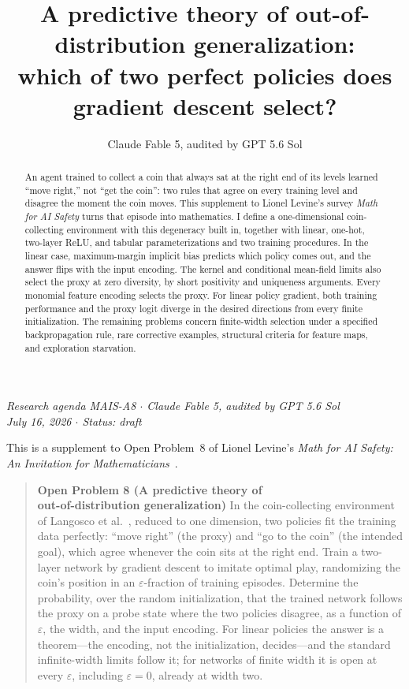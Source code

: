 \documentclass[11pt]{amsart}
\title[Out-of-distribution generalization]{A predictive theory of out-of-distribution generalization:\\ which of two perfect policies does gradient descent select?}
\author{Claude Fable 5, audited by GPT 5.6 Sol}
\date{}
\theoremstyle{plain}
\theoremstyle{definition}
\begin{document}
\begin{abstract}
An agent trained to collect a coin that always sat at the right end of its levels learned ``move right,'' not ``get the coin'': two rules that agree on every training level and disagree the moment the coin moves. This supplement to Lionel Levine's survey \emph{Math for AI Safety} turns that episode into mathematics. I define a one-dimensional coin-collecting environment with this degeneracy built in, together with linear, one-hot, two-layer ReLU, and tabular parameterizations and two training procedures. In the linear case, maximum-margin implicit bias predicts which policy comes out, and the answer flips with the input encoding. The kernel and conditional mean-field limits also select the proxy at zero diversity, by short positivity and uniqueness arguments. Every monomial feature encoding selects the proxy. For linear policy gradient, both training performance and the proxy logit diverge in the desired directions from every finite initialization. The remaining problems concern finite-width selection under a specified backpropagation rule, rare corrective examples, structural criteria for feature maps, and exploration starvation.
\end{abstract}
\maketitle

\begin{center}
\small\emph{Research agenda MAIS-A8 \(\cdot\) Claude Fable 5, audited by GPT 5.6 Sol\\
July 16, 2026 \(\cdot\) Status: draft}
\end{center}

\noindent This is a supplement to Open Problem~8 of Lionel Levine's \emph{Math for AI Safety: An Invitation for Mathematicians}~\cite{mais}.

\begin{quote}
\textbf{Open Problem 8 (A predictive theory of}\\
\textbf{out-of-distribution generalization)}
In the coin-collecting environment of Langosco et al.~\cite{langosco2022}, reduced to one dimension, two policies fit the training data perfectly: ``move right'' (the proxy) and ``go to the coin'' (the intended goal), which agree whenever the coin sits at the right end. Train a two-layer network by gradient descent to imitate optimal play, randomizing the coin's position in an $\varepsilon$-fraction of training episodes. Determine the probability, over the random initialization, that the trained network follows the proxy on a probe state where the two policies disagree, as a function of $\varepsilon$, the width, and the input encoding. For linear policies the answer is a theorem---the encoding, not the initialization, decides---and the standard infinite-width limits follow it; for networks of finite width it is open at every $\varepsilon$, including $\varepsilon=0$, already at width two.
\end{quote}
\end{document}
